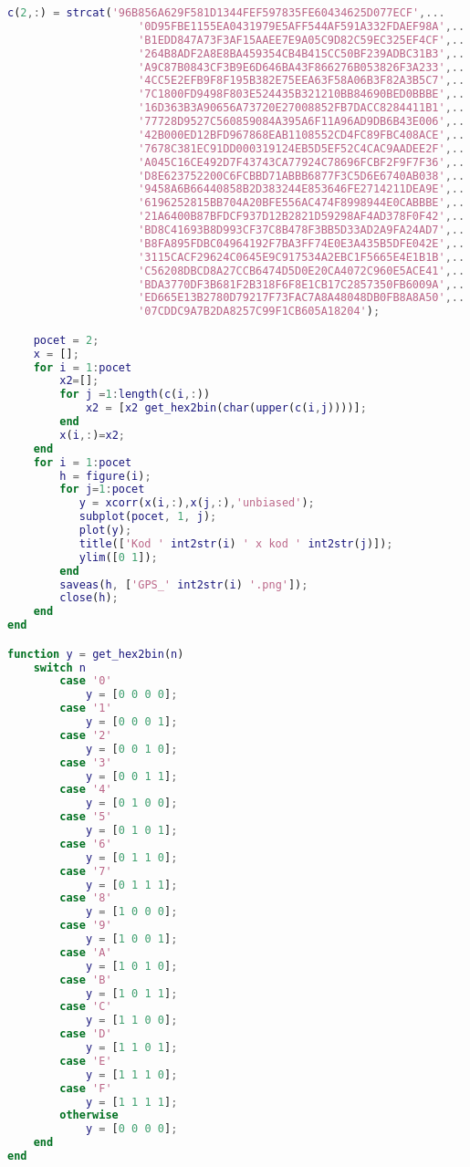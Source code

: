\documentclass[11pt, a4paper]{article}
\begin{document}
\begin{lstlisting}[language=matlab, frame=single]
    c(2,:) = strcat('96B856A629F581D1344FEF597835FE60434625D077ECF',...
                    '0D95FBE1155EA0431979E5AFF544AF591A332FDAEF98A',...
                    'B1EDD847A73F3AF15AAEE7E9A05C9D82C59EC325EF4CF',...
                    '264B8ADF2A8E8BA459354CB4B415CC50BF239ADBC31B3',...
                    'A9C87B0843CF3B9E6D646BA43F866276B053826F3A233',...
                    '4CC5E2EFB9F8F195B382E75EEA63F58A06B3F82A3B5C7',...
                    '7C1800FD9498F803E524435B321210BB84690BED0BBBE',...
                    '16D363B3A90656A73720E27008852FB7DACC8284411B1',...
                    '77728D9527C560859084A395A6F11A96AD9DB6B43E006',...
                    '42B000ED12BFD967868EAB1108552CD4FC89FBC408ACE',...
                    '7678C381EC91DD000319124EB5D5EF52C4CAC9AADEE2F',...
                    'A045C16CE492D7F43743CA77924C78696FCBF2F9F7F36',...
                    'D8E623752200C6FCBBD71ABBB6877F3C5D6E6740AB038',...
                    '9458A6B66440858B2D383244E853646FE2714211DEA9E',...
                    '6196252815BB704A20BFE556AC474F8998944E0CABBBE',...
                    '21A6400B87BFDCF937D12B2821D59298AF4AD378F0F42',...
                    'BD8C41693B8D993CF37C8B478F3BB5D33AD2A9FA24AD7',...
                    'B8FA895FDBC04964192F7BA3FF74E0E3A435B5DFE042E',...
                    '3115CACF29624C0645E9C917534A2EBC1F5665E4E1B1B',...
                    'C56208DBCD8A27CCB6474D5D0E20CA4072C960E5ACE41',...
                    'BDA3770DF3B681F2B318F6F8E1CB17C2857350FB6009A',...
                    'ED665E13B2780D79217F73FAC7A8A48048DB0FB8A8A50',...
                    '07CDDC9A7B2DA8257C99F1CB605A18204');

    pocet = 2;
    x = [];
    for i = 1:pocet
        x2=[];
        for j =1:length(c(i,:))
            x2 = [x2 get_hex2bin(char(upper(c(i,j))))];
        end
        x(i,:)=x2;
    end
    for i = 1:pocet
        h = figure(i);
        for j=1:pocet
           y = xcorr(x(i,:),x(j,:),'unbiased');
           subplot(pocet, 1, j);
           plot(y);
           title(['Kod ' int2str(i) ' x kod ' int2str(j)]);
           ylim([0 1]);
        end
        saveas(h, ['GPS_' int2str(i) '.png']);
        close(h);
    end
end

function y = get_hex2bin(n)
    switch n
        case '0'
            y = [0 0 0 0];
        case '1'
            y = [0 0 0 1];
        case '2'
            y = [0 0 1 0];
        case '3'
            y = [0 0 1 1];
        case '4'
            y = [0 1 0 0];
        case '5'
            y = [0 1 0 1];
        case '6'
            y = [0 1 1 0];
        case '7'
            y = [0 1 1 1];
        case '8'
            y = [1 0 0 0];
        case '9'
            y = [1 0 0 1];
        case 'A'
            y = [1 0 1 0];
        case 'B'
            y = [1 0 1 1];
        case 'C'
            y = [1 1 0 0];
        case 'D'
            y = [1 1 0 1];
        case 'E'
            y = [1 1 1 0];
        case 'F'
            y = [1 1 1 1];
        otherwise
            y = [0 0 0 0];
    end
end


\end{lstlisting}
\end{document}
